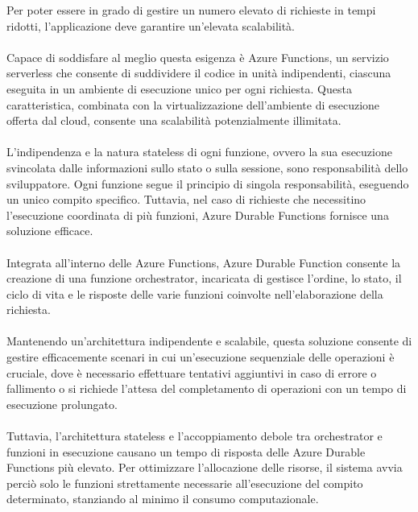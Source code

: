 Per poter essere in grado di gestire un numero elevato di richieste in tempi ridotti, l’applicazione deve garantire un’elevata scalabilità.\\
\\
Capace di soddisfare al meglio questa esigenza è Azure Functions, un servizio serverless che consente di suddividere il codice in unità indipendenti,
ciascuna eseguita in un ambiente di esecuzione unico per ogni richiesta.
Questa caratteristica, combinata con la virtualizzazione dell’ambiente di esecuzione offerta dal cloud, consente una scalabilità potenzialmente illimitata.\\
\\
L’indipendenza e la natura stateless di ogni funzione, ovvero la sua esecuzione svincolata dalle informazioni sullo stato o sulla sessione, sono responsabilità dello sviluppatore.
Ogni funzione segue il principio di singola responsabilità, eseguendo un unico compito specifico.
Tuttavia, nel caso di richieste che necessitino l’esecuzione coordinata di più funzioni, Azure Durable Functions fornisce una soluzione efficace.\\
\\
Integrata all’interno delle Azure Functions, Azure Durable Function consente la creazione di una funzione orchestrator,
incaricata di gestisce l’ordine, lo stato, il ciclo di vita e le risposte delle varie funzioni coinvolte nell’elaborazione della richiesta.\\
\\
Mantenendo un'architettura indipendente e scalabile, questa soluzione consente di gestire efficacemente scenari in cui un’esecuzione sequenziale delle operazioni è cruciale,
dove è necessario effettuare tentativi aggiuntivi in caso di errore o fallimento o si richiede l'attesa del completamento di operazioni con un tempo di esecuzione prolungato.\\
\\
Tuttavia, l'architettura stateless e l’accoppiamento debole tra orchestrator e funzioni in esecuzione causano un tempo di risposta delle Azure Durable Functions più elevato.
Per ottimizzare l’allocazione delle risorse, il sistema avvia perciò solo le funzioni strettamente necessarie all’esecuzione del compito determinato,
stanziando al minimo il consumo computazionale.\\
\\

